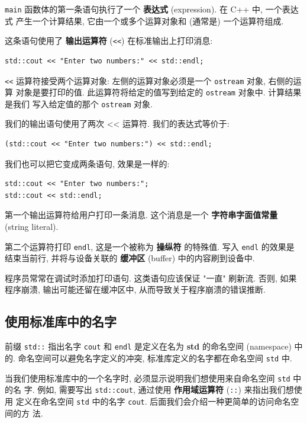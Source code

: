 \documentclass[lang=cn]{elegantbook}
\begin{document}
\texttt{main} 函数体的第一条语句执行了一个 \textbf{表达式} (expression). 在 C++ 中, 一个表达式
产生一个计算结果, 它由一个或多个运算对象和 (通常是) 一个运算符组成.

这条语句使用了 \textbf{输出运算符} (\texttt{<<}) 在标准输出上打印消息:

\begin{verbatim}
std::cout << "Enter two numbers:" << std::endl;
\end{verbatim}

\texttt{<<} 运算符接受两个运算对象: 左侧的运算对象必须是一个 \texttt{ostream} 对象, 右侧的运算
对象是要打印的值. 此运算符将给定的值写到给定的 \texttt{ostream} 对象中. 计算结果是我们
写入给定值的那个 \texttt{ostream} 对象.

我们的输出语句使用了两次 << 运算符. 我们的表达式等价于:

\begin{verbatim}
(std::cout << "Enter two numbers:") << std::endl;
\end{verbatim}

我们也可以把它变成两条语句, 效果是一样的:

\begin{verbatim}
std::cout << "Enter two numbers:";
std::cout << std::endl;
\end{verbatim}

第一个输出运算符给用户打印一条消息. 这个消息是一个 \textbf{字符串字面值常量} (string
literal).

第二个运算符打印 \texttt{endl}, 这是一个被称为 \textbf{操纵符} 的特殊值. 写入 \texttt{endl} 的效果是
结束当前行, 并将与设备关联的 \textbf{缓冲区} (buffer) 中的内容刷到设备中.

\vspace*{1\baselineskip}
\begin{note}
程序员常常在调试时添加打印语句. 这类语句应该保证 "一直" 刷新流. 否则, 如果程序崩溃, 输出可能还留在缓冲区中, 从而导致关于程序崩溃的错误推断.
\end{note}

\subsection{使用标准库中的名字}
\label{sec:orgf8d9bd6}

前缀 \texttt{std::} 指出名字 \texttt{cout} 和 \texttt{endl} 是定义在名为 \textbf{std} 的命名空间 (namespace)
中的. 命名空间可以避免名字定义的冲突, 标准库定义的名字都在命名空间 \texttt{std} 中.

当我们使用标准库中的一个名字时, 必须显示说明我们想使用来自命名空间 \texttt{std} 中的名
字. 例如, 需要写出 \texttt{std::cout}, 通过使用 \textbf{作用域运算符} (\texttt{::}) 来指出我们想使用
定义在命名空间 \texttt{std} 中的名字 \texttt{cout}. 后面我们会介绍一种更简单的访问命名空间的方
法.
\end{document}
